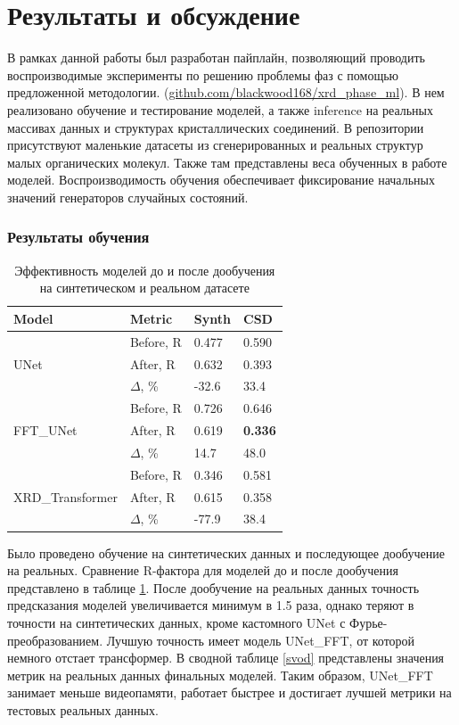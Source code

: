 \section{Результаты и обсуждение}

В рамках данной работы был разработан пайплайн, позволяющий проводить воспроизводимые эксперименты по решению проблемы фаз с помощью предложенной методологии. (\url{github.com/blackwood168/xrd_phase_ml}). В нем реализовано обучение и тестирование моделей, а также inference на реальных массивах данных и структурах кристаллических соединений. В репозитории присутствуют маленькие датасеты из сгенерированных и реальных структур малых органических молекул. Также там представлены веса обученных в работе моделей. Воспроизводимость обучения обеспечивает фиксирование начальных значений генераторов случайных состояний.

\subsubsection*{Результаты обучения}

\begin{table}[H]
\caption{Эффективность моделей до и после дообучения на синтетическом и реальном датасете}
\label{doposle}
\centering
\footnotesize
\begin{tabular}{|l|l|l|l|} 
\hline
\textbf{Model} & \textbf{Metric} & \textbf{Synth} & \textbf{CSD}  \\ 
\hline
\multirow{3}{*}{UNet} 
& Before, R & 0.477 & 0.590 \\ 
& After, R  & 0.632 & 0.393 \\ 
& $\Delta$, \%       & -32.6 & 33.4  \\
\hline
\multirow{3}{*}{FFT\_UNet}
& Before, R & 0.726 & 0.646 \\ 
& After, R  & 0.619 & \textbf{0.336} \\ 
& $\Delta$, \%       & 14.7  & 48.0  \\
\hline
\multirow{3}{*}{XRD\_Transformer}
& Before, R & 0.346 & 0.581 \\ 
& After, R  & 0.615 & 0.358 \\ 
& $\Delta$, \%       & -77.9 & 38.4  \\
\hline
\end{tabular}
\end{table}

Было проведено обучение на синтетических данных и последующее дообучение на реальных. Сравнение R-фактора для моделей до и после дообучения представлено в таблице \ref{doposle}. После дообучение на реальных данных точность предсказания моделей увеличивается минимум в 1.5 раза, однако теряют в точности на синтетических данных, кроме кастомного UNet с Фурье-преобразованием. Лучшую точность имеет модель UNet\_FFT, от которой немного отстает трансформер. В сводной таблице \ref{svod} представлены значения метрик на реальных данных финальных моделей. Таким образом, UNet\_FFT занимает меньше видеопамяти, работает быстрее и достигает лучшей метрики на тестовых реальных данных.

